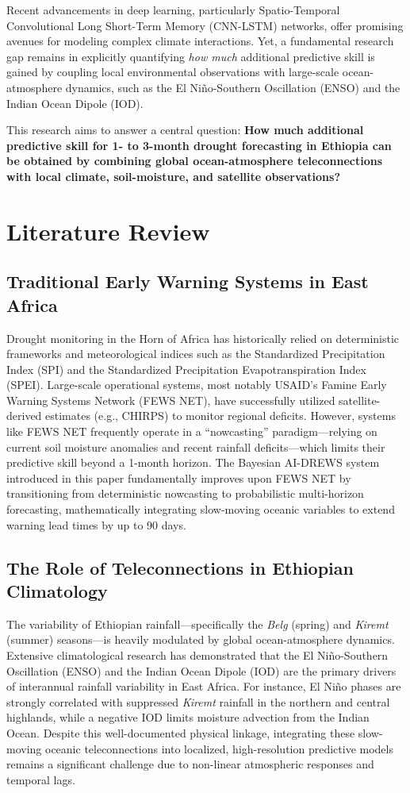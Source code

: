 \documentclass[3p,times]{elsarticle}
\begin{document}
Recent advancements in deep learning, particularly Spatio-Temporal Convolutional Long Short-Term Memory (CNN-LSTM) networks, offer promising avenues for modeling complex climate interactions. Yet, a fundamental research gap remains in explicitly quantifying \textit{how much} additional predictive skill is gained by coupling local environmental observations with large-scale ocean-atmosphere dynamics, such as the El Ni\~no-Southern Oscillation (ENSO) and the Indian Ocean Dipole (IOD). 

This research aims to answer a central question: \textbf{How much additional predictive skill for 1- to 3-month drought forecasting in Ethiopia can be obtained by combining global ocean-atmosphere teleconnections with local climate, soil-moisture, and satellite observations?}

\section{Literature Review}

\subsection{Traditional Early Warning Systems in East Africa}
Drought monitoring in the Horn of Africa has historically relied on deterministic frameworks and meteorological indices such as the Standardized Precipitation Index (SPI) and the Standardized Precipitation Evapotranspiration Index (SPEI). Large-scale operational systems, most notably USAID's Famine Early Warning Systems Network (FEWS NET), have successfully utilized satellite-derived estimates (e.g., CHIRPS) to monitor regional deficits. However, systems like FEWS NET frequently operate in a ``nowcasting'' paradigm---relying on current soil moisture anomalies and recent rainfall deficits---which limits their predictive skill beyond a 1-month horizon. The Bayesian AI-DREWS system introduced in this paper fundamentally improves upon FEWS NET by transitioning from deterministic nowcasting to probabilistic multi-horizon forecasting, mathematically integrating slow-moving oceanic variables to extend warning lead times by up to 90 days.

\subsection{The Role of Teleconnections in Ethiopian Climatology}
The variability of Ethiopian rainfall---specifically the \textit{Belg} (spring) and \textit{Kiremt} (summer) seasons---is heavily modulated by global ocean-atmosphere dynamics. Extensive climatological research has demonstrated that the El Ni\~no-Southern Oscillation (ENSO) and the Indian Ocean Dipole (IOD) are the primary drivers of interannual rainfall variability in East Africa. For instance, El Ni\~no phases are strongly correlated with suppressed \textit{Kiremt} rainfall in the northern and central highlands, while a negative IOD limits moisture advection from the Indian Ocean. Despite this well-documented physical linkage, integrating these slow-moving oceanic teleconnections into localized, high-resolution predictive models remains a significant challenge due to non-linear atmospheric responses and temporal lags.
\end{document}
